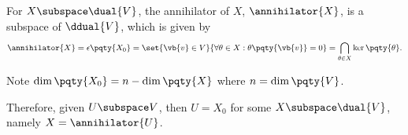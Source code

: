 \begin{remark}
    For \(X \subspace \dual{V}\), the annihilator of \(X\), \(\annihilator{X}\), is a subspace of \(\ddual{V}\), which is given by
    \[
        \annihilator{X} = \epsilon\pqty{X_0} = \set{\vb{v} \in V}{\forall \theta \in X: \theta\pqty{\vb{v}} = 0} = \bigcap_{\theta \in X} \ker\pqty{\theta}.
    \]

    Note \(\dim \pqty{X_0} = n - \dim \pqty{X}\) where \(n = \dim\pqty{V}\).

    Therefore, given \(U \subspace V\), then \(U = X_0\) for some \(X \subspace \dual{V}\), namely \(X = \annihilator{U}\).
\end{remark}